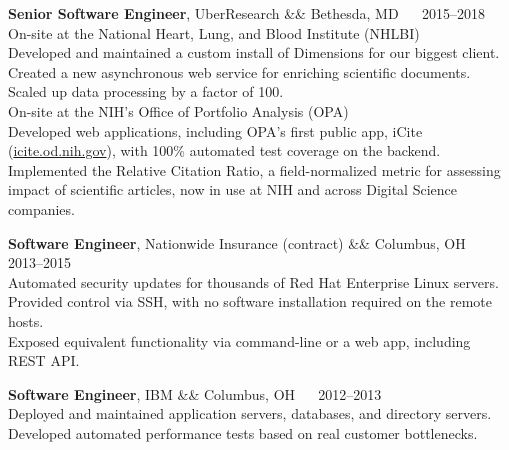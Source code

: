 \documentclass[12pt]{report}
\makeatletter
\renewcommand{\bullet}{$\vcenter{\hbox{~\huge$\cdot$~}}$}
\newenvironment{jobhead}
{\tabularx{\textwidth}{ @{} l X r @{} }}
{\endtabularx}
\newenvironment{bullets}
{\tabularx{\textwidth}{ @{\bullet} X @{} }}
{\endtabularx}
\makeatother
\begin{document}
\begin{jobhead}
\textbf{Senior Software Engineer}, UberResearch && Bethesda, MD ~~ 2015--2018 \\
\end{jobhead}
On-site at the National Heart, Lung, and Blood Institute (NHLBI) \\
\begin{bullets}
Developed and maintained a custom install of Dimensions for our biggest client. \\
Created a new asynchronous web service for enriching scientific documents. \\
Scaled up data processing by a factor of 100. \\
\end{bullets}
On-site at the NIH's Office of Portfolio Analysis (OPA) \\
\begin{bullets}
Developed web applications, including OPA's first public app, iCite (\href{https://icite.od.nih.gov}{icite.od.nih.gov}), with 100\% automated test coverage on the backend. \\
Implemented the Relative Citation Ratio, a field-normalized metric for assessing impact of scientific articles, now in use at NIH and across Digital Science companies. \\
\end{bullets}

\begin{jobhead}
\textbf{Software Engineer}, Nationwide Insurance (contract) && Columbus, OH ~~ 2013--2015 \\
\end{jobhead}
\begin{bullets}
Automated security updates for thousands of Red Hat Enterprise Linux servers. \\
Provided control via SSH, with no software installation required on the remote hosts. \\
Exposed equivalent functionality via command-line or a web app, including REST API. \\
\end{bullets}

\begin{jobhead}
\textbf{Software Engineer}, IBM && Columbus, OH ~~ 2012--2013 \\
\end{jobhead}
\begin{bullets}
Deployed and maintained application servers, databases, and directory servers. \\
Developed automated performance tests based on real customer bottlenecks. \\
\end{bullets}
\end{document}

